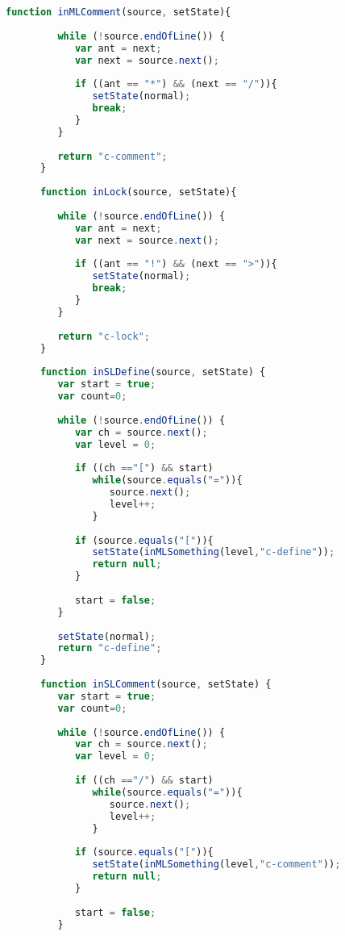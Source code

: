 \begin{lstlisting}[language=Javascript]
      function inMLComment(source, setState){
         
         while (!source.endOfLine()) {
         	var ant = next;
            var next = source.next();
            
            if ((ant == "*") && (next == "/")){
               setState(normal);
               break;
            }
         }
        
         return "c-comment";
      }
      
      function inLock(source, setState){
         
         while (!source.endOfLine()) {
         	var ant = next;
            var next = source.next();
            
            if ((ant == "!") && (next == ">")){
               setState(normal);
               break;
            }
         }
        
         return "c-lock";
      }
      
      function inSLDefine(source, setState) {
      	 var start = true;
         var count=0;
      
         while (!source.endOfLine()) {
            var ch = source.next();
            var level = 0;
    
            if ((ch =="[") && start)
               while(source.equals("=")){
                  source.next();
                  level++;
               }
         
            if (source.equals("[")){
               setState(inMLSomething(level,"c-define"));
               return null;
            }
      
            start = false;  
         }
   
         setState(normal);          
         return "c-define";
      }
 
      function inSLComment(source, setState) {
         var start = true;
         var count=0;
      
         while (!source.endOfLine()) {
            var ch = source.next();
            var level = 0;
    
            if ((ch =="/") && start)
               while(source.equals("=")){
                  source.next();
                  level++;
               }
         
            if (source.equals("[")){
               setState(inMLSomething(level,"c-comment"));
               return null;
            }
      
            start = false;  
         }
   

\end{lstlisting}
